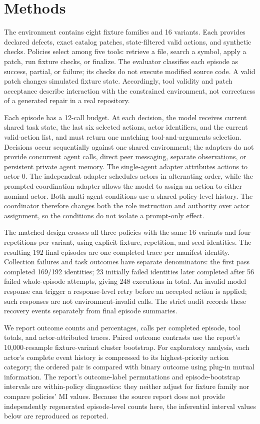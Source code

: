 \documentclass[conference]{IEEEtran}
\begin{document}
\section{Methods}

The environment contains eight fixture families and 16 variants. Each provides declared defects, exact catalog patches, state-filtered valid actions, and synthetic checks. Policies select among five tools: retrieve a file, search a symbol, apply a patch, run fixture checks, or finalize. The evaluator classifies each episode as success, partial, or failure; its checks do not execute modified source code. A valid patch changes simulated fixture state. Accordingly, tool validity and patch acceptance describe interaction with the constrained environment, not correctness of a generated repair in a real repository.

Each episode has a 12-call budget. At each decision, the model receives current shared task state, the last six selected actions, actor identifiers, and the current valid-action list, and must return one matching tool-and-arguments selection. Decisions occur sequentially against one shared environment; the adapters do not provide concurrent agent calls, direct peer messaging, separate observations, or persistent private agent memory. The single-agent adapter attributes actions to actor 0. The independent adapter schedules actors in alternating order, while the prompted-coordination adapter allows the model to assign an action to either nominal actor. Both multi-agent conditions use a shared policy-level history. The coordinator therefore changes both the role instruction and authority over actor assignment, so the conditions do not isolate a prompt-only effect.

The matched design crosses all three policies with the same 16 variants and four repetitions per variant, using explicit fixture, repetition, and seed identities. The resulting 192 final episodes are one completed trace per manifest identity. Collection failures and task outcomes have separate denominators: the first pass completed 169/192 identities; 23 initially failed identities later completed after 56 failed whole-episode attempts, giving 248 executions in total. An invalid model response can trigger a response-level retry before an accepted action is applied; such responses are not environment-invalid calls. The strict audit records these recovery events separately from final episode summaries.

We report outcome counts and percentages, calls per completed episode, tool totals, and actor-attributed traces. Paired outcome contrasts use the report's 10,000-resample fixture-variant cluster bootstrap. For exploratory analysis, each actor's complete event history is compressed to its highest-priority action category; the ordered pair is compared with binary outcome using plug-in mutual information. The report's outcome-label permutations and episode-bootstrap intervals are within-policy diagnostics: they neither adjust for fixture family nor compare policies' MI values. Because the source report does not provide independently regenerated episode-level counts here, the inferential interval values below are reproduced as reported.
\end{document}
